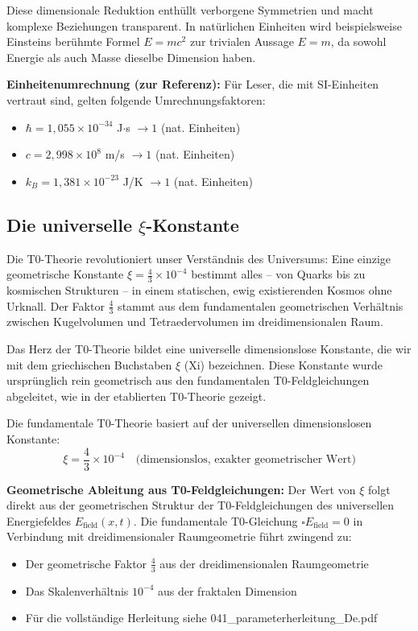 \documentclass[12pt,a4paper]{article}
\begin{document}
	Diese dimensionale Reduktion enthüllt verborgene Symmetrien und macht komplexe Beziehungen transparent. In natürlichen Einheiten wird beispielsweise Einsteins berühmte Formel $E = mc^2$ zur trivialen Aussage $E = m$, da sowohl Energie als auch Masse dieselbe Dimension haben.
	
	\textbf{Einheitenumrechnung (zur Referenz):}
	Für Leser, die mit SI-Einheiten vertraut sind, gelten folgende Umrechnungsfaktoren:
	\begin{itemize}
		\item $\hbar = 1{,}055 \times 10^{-34}$ J$\cdot$s $\rightarrow 1$ (nat. Einheiten)
		\item $c = 2{,}998 \times 10^8$ m/s $\rightarrow 1$ (nat. Einheiten)  
		\item $k_B = 1{,}381 \times 10^{-23}$ J/K $\rightarrow 1$ (nat. Einheiten)
	\end{itemize}
	
	\subsection{Die universelle $\xi$-Konstante}
	
	\begin{revolutionary}
		Die T0-Theorie revolutioniert unser Verständnis des Universums: Eine einzige geometrische Konstante $\xi = \frac{4}{3} \times 10^{-4}$ bestimmt alles -- von Quarks bis zu kosmischen Strukturen -- in einem statischen, ewig existierenden Kosmos ohne Urknall. Der Faktor $\frac{4}{3}$ stammt aus dem fundamentalen geometrischen Verhältnis zwischen Kugelvolumen und Tetraedervolumen im dreidimensionalen Raum.
	\end{revolutionary}
	
	Das Herz der T0-Theorie bildet eine universelle dimensionslose Konstante, die wir mit dem griechischen Buchstaben $\xi$ (Xi) bezeichnen. Diese Konstante wurde ursprünglich rein geometrisch aus den fundamentalen T0-Feldgleichungen abgeleitet, wie in der etablierten T0-Theorie \cite{T0Theory} gezeigt.
	
	Die fundamentale T0-Theorie basiert auf der universellen dimensionslosen Konstante:
	\begin{equation}
		\xi = \frac{4}{3} \times 10^{-4} \quad \text{(dimensionslos, exakter geometrischer Wert)}
	\end{equation}
	
	\textbf{Geometrische Ableitung aus T0-Feldgleichungen:} Der Wert von $\xi$ folgt direkt aus der geometrischen Struktur der T0-Feldgleichungen des universellen Energiefeldes $E_{\text{field}}(x,t)$. Die fundamentale T0-Gleichung $\square E_{\text{field}} = 0$ in Verbindung mit dreidimensionaler Raumgeometrie führt zwingend zu:
\begin{itemize}
	\item Der geometrische Faktor $\frac{4}{3}$ aus der dreidimensionalen Raumgeometrie
	\item Das Skalenverhältnis $10^{-4}$ aus der fraktalen Dimension
	\item Für die vollständige Herleitung siehe 041\_parameterherleitung\_De.pdf 
\end{itemize}
	
\end{document}
